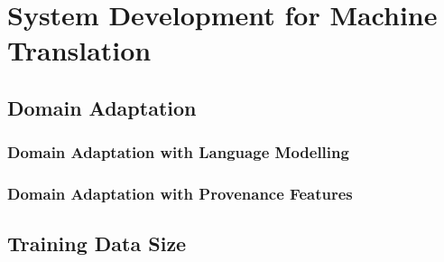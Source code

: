 \chapter{System Development for Machine Translation}
\label{chap:wmt}


\section{Domain Adaptation}

\subsection{Domain Adaptation with Language Modelling}


\subsection{Domain Adaptation with Provenance Features}


\section{Training Data Size}

